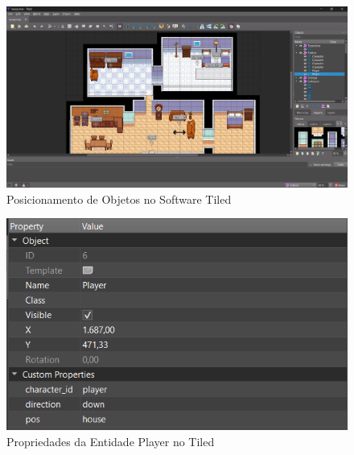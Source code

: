 \begin{figure}[h!]
    \centering
    \includegraphics[width=1\linewidth]{figuras/tiled-house.png}
    \caption{Posicionamento de Objetos no Software Tiled }
    \label{fig:tiled-house}
\end{figure}

\begin{figure}[h!]
    \centering
    \includegraphics[width=1\linewidth]{figuras/tiled-player-properties.png}
    \caption{Propriedades da Entidade Player no Tiled}
    \label{fig:tiled-player-properties}
\end{figure}

